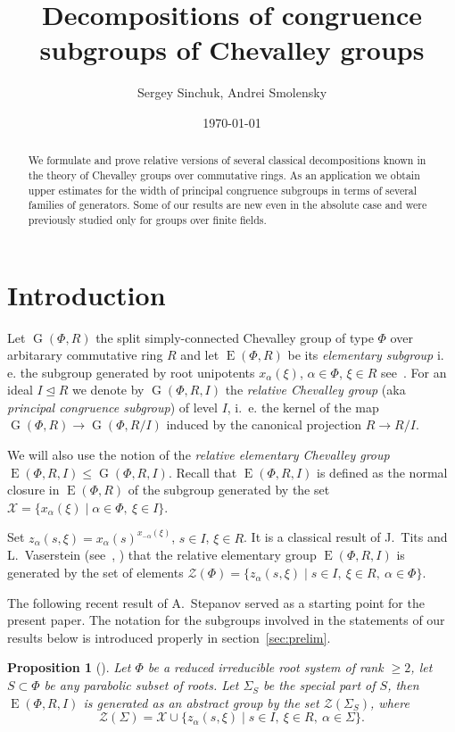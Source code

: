 \documentclass[12pt]{amsart}
\title {Decompositions of congruence subgroups of Chevalley groups}
\author {Sergey Sinchuk, Andrei Smolensky}
\date {\today}
\theoremstyle{plain}
\numberwithin{equation}{section}
\numberwithin{lemma}{section}
\newtheorem{prop}[lemma]{Proposition}
\theoremstyle{definition}
\theoremstyle{remark}
\DeclareMathOperator{\G}{G}
\DeclareMathOperator{\E}{E}
\begin{document}
\begin{abstract} 
We formulate and prove relative versions of several classical decompositions known in the theory of Chevalley groups over commutative rings. %
As an application we obtain upper estimates for the width of principal congruence subgroups in terms of several families of generators.
Some of our results are new even in the absolute case and were previously studied only for groups over finite fields.
\end{abstract}

\maketitle

\section{Introduction}\label{sec:intro}
Let $\G(\Phi, R)$ the split simply-connected Chevalley group of type $\Phi$ over arbitarary commutative ring $R$ and let $\E(\Phi, R)$ be its \emph{elementary subgroup}
i.\, e. the subgroup generated by root unipotents $x_\alpha(\xi)$, $\alpha\in\Phi$, $\xi\in R$ see~\cite{VP, St78, S}.
For an ideal $I \trianglelefteq R$ we denote by $\G(\Phi, R, I)$ the \emph{relative Chevalley group} (aka \emph{principal congruence subgroup}) of level $I$, 
i.\, e. the kernel of the map $\G(\Phi, R)\rightarrow\G(\Phi, R/I)$ induced by the canonical projection $R\rightarrow R/I$.

We will also use the notion of the \emph{relative elementary Chevalley group} $\E(\Phi, R, I) \leqslant \G(\Phi, R, I)$.
Recall that $\E(\Phi, R, I)$ is defined as the normal closure in $\E(\Phi, R)$ of the subgroup generated by the set $\mathcal{X} = \{x_\alpha(\xi) \mid \alpha\in \Phi, \ \xi \in I \}$.

Set $z_\alpha(s, \xi) = x_{\alpha}(s)^{x_{-\alpha}(\xi)}$, $s\in I$, $\xi\in R$.
It is a classical result of J.~Tits and L.~Vaserstein (see~\cite{Tits76}, \cite[Theorem~2]{Va86}) that the relative elementary group $\E(\Phi, R, I)$ is generated by
the set of elements $\mathcal{Z}(\Phi) = \{ z_\alpha(s, \xi) \mid s\in I, \ \xi \in R, \ \alpha \in \Phi\}.$

The following recent result of A.~Stepanov served as a starting point for the present paper.
The notation for the subgroups involved in the statements of our results below is introduced properly in section~\ref{sec:prelim}.
\begin{prop}[{\cite[Theorem~3.4]{S}}] \label{prop:Stepanov}
Let $\Phi$ be a reduced irreducible root system of rank $\geq 2$, let $S \subset \Phi$ be any parabolic subset of roots.
Let $\Sigma_S$ be the special part of $S$, then $\E(\Phi, R, I)$ is generated as an abstract group by the set $\mathcal{Z}(\Sigma_S)$, where
$$\mathcal{Z}(\Sigma) = \mathcal{X} \cup \{ z_\alpha(s, \xi) \mid s \in I, \ \xi \in R, \ \alpha\in \Sigma \}.$$ \end{prop}
\end{document}
